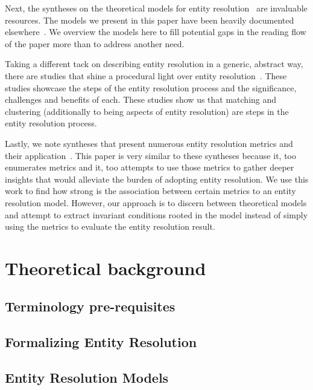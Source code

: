 \documentclass[journal]{IEEEtran}
\begin{document}
    Next, the syntheses on the theoretical models for entity
    resolution~\cite{fs1969,Ben2009Swoosh,Tal11} are invaluable resources.
    The models we present in this paper have been heavily documented
    elsewhere~\cite{Tal11,tal2013}.    
    We overview the models here to fill potential gaps in the reading flow of
    the paper more than to address another need.
    
    Taking a different tack on describing entity resolution in a generic,
    abstract way, there are studies that shine a procedural light over entity
    resolution~\cite{Pap19,Chen09}.
    These studies showcase the steps of the entity resolution process and the
    significance, challenges and benefits of each.
    These studies show us that matching and clustering (additionally to being
    aspects of entity resolution) are steps in the entity resolution process.

    Lastly, we note syntheses that present numerous entity resolution metrics
    and their application~\cite{hitesh2012,graf2021frost,barnes2015practioner}.
    This paper is very similar to these syntheses because it, too enumerates
    metrics and it, too attempts to use those metrics to gather deeper insights
    that would alleviate the burden of adopting entity resolution.
    We use this work to find how strong is the association between certain
    metrics to an entity resolution model.
    However, our approach is to discern between theoretical models and attempt
    to extract invariant conditions rooted in the model instead of simply using
    the metrics to evaluate the entity resolution result.

    \section{Theoretical background}
    \subsection[terminology]{Terminology pre-requisites}\label{sec:terminology}
    
    
    \subsection{Formalizing Entity Resolution}\label{sec:entity-resolution}
    

    \subsection[models]{Entity Resolution Models}\label{sec:models}
\end{document}
